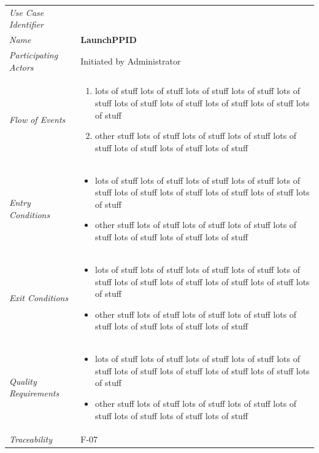\documentclass[12pt,letterpaper]{article}
\begin{document}
\begin{center}
	\begin{tabu} to 
		\toprule
		Use Case Identifier & \launchppid{} \\
		Name & {\bf LaunchPPID} \\
		Participating Actors & Initiated by Administrator \\
		Flow of Events & 
	    \begin{enumerate}[topsep=-1em]
		    \item lots of stuff lots of stuff lots of stuff lots of stuff lots of stuff lots of stuff lots of stuff lots of stuff lots of stuff lots of stuff
		    \item other stuff lots of stuff lots of stuff lots of stuff lots of stuff lots of stuff lots of stuff lots of stuff
		\end{enumerate} \\

		Entry Conditions &
		\begin{itemize}[topsep=-1em]
		    \item lots of stuff lots of stuff lots of stuff lots of stuff lots of stuff lots of stuff lots of stuff lots of stuff lots of stuff lots of stuff
		    \item other stuff lots of stuff lots of stuff lots of stuff lots of stuff lots of stuff lots of stuff lots of stuff
        \end{itemize} \\

		Exit Conditions &
		\begin{itemize}[topsep=-1em]
		    \item lots of stuff lots of stuff lots of stuff lots of stuff lots of stuff lots of stuff lots of stuff lots of stuff lots of stuff lots of stuff
		    \item other stuff lots of stuff lots of stuff lots of stuff lots of stuff lots of stuff lots of stuff lots of stuff
        \end{itemize} \\

		Quality Requirements &
		\begin{itemize}[topsep=-1em]
		    \item lots of stuff lots of stuff lots of stuff lots of stuff lots of stuff lots of stuff lots of stuff lots of stuff lots of stuff lots of stuff
		    \item other stuff lots of stuff lots of stuff lots of stuff lots of stuff lots of stuff lots of stuff lots of stuff
        \end{itemize} \\

		Traceability & F-07 \\
		\toprule
	\end{tabu}
\end{center}
\end{document}
